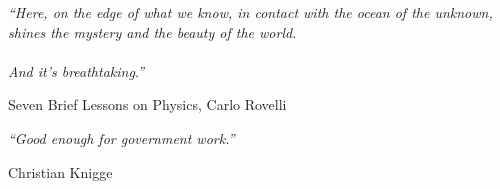 \documentclass[a4paper, 11pt, oneside]{Thesis}  %
\begin{document}
 
 
 

\pagestyle{empty}  %

\null\vfill
\textit{``Here, on the edge of what we know, in contact with the ocean of the unknown, shines the mystery and the beauty of the world.\\\\And it's breathtaking.''}

\begin{flushright}
Seven Brief Lessons on Physics, Carlo Rovelli
\end{flushright}

\textit{``Good enough for government work.''}

\begin{flushright}
Christian Knigge
\end{flushright}

\vfill\vfill\vfill\vfill\vfill\vfill\null
\clearpage  %
\end{document}

